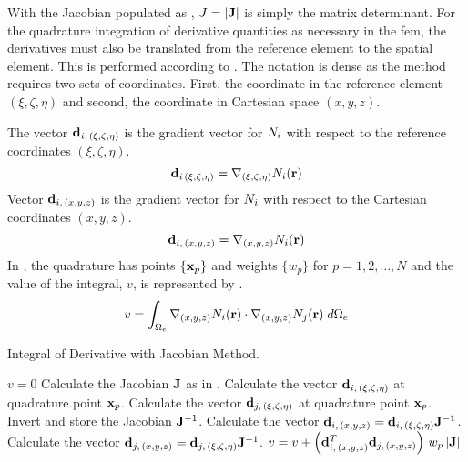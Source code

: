     With the Jacobian populated as , $J=\lvert\mathbf{J}\rvert$
    is simply the matrix determinant. For the quadrature integration of 
    derivative quantities as necessary in the \gls{fem}, the derivatives must 
    also be translated from the reference element to the spatial element. This 
    is performed according to . The notation 
    is dense as the method requires two sets of coordinates. First, the 
    coordinate in the reference element $(\xi,\zeta,\eta)$ and second, the 
    coordinate in Cartesian space $(x,y,z)$.

    The vector $\mathbf{d}_{i,\,(\xi,\zeta,\eta)}$ is the gradient vector for
    $N_i$ with respect to the reference coordinates $(\xi,\zeta,\eta)$.
    \begin{equation}
      \mathbf{d}_{i\,(\xi,\zeta,\eta)} = \mathbf{\nabla}_{(\xi,\zeta,\eta)} N_i(\mathbf{r}) 
    \end{equation}
    Vector $\mathbf{d}_{i,\,(x,y,z)}$ is the gradient vector for $N_i$ with
    respect to the Cartesian coordinates $(x,y,z)$. 
    \begin{equation}
      \mathbf{d}_{i,\,(x,y,z)} = \mathbf{\nabla}_{(x,y,z)} N_i(\mathbf{r})
    \end{equation}
    In , the quadrature has points $\{\mathbf{x}_p\}$ 
    and weights $\{w_p\}$ for $p = 1,2,\ldots,N$ and the value of the integral,
    $v$, is represented by .
    \begin{equation}
      \label{eq:deriv_integral}
      v = \int_{\Omega_e} \mathbf{\nabla}_{(x,y,z)} N_i(\mathbf{r}) \cdot 
        \mathbf{\nabla}_{(x,y,z)} N_j(\mathbf{r}) \; d\Omega_e
    \end{equation}

    \begin{algorithm}
      \caption{Integral of Derivative with Jacobian Method.}
      \label{algorithm:deriv_int}
      \begin{algorithmic}[1]
        \State $v=0$
          \State Calculate the Jacobian $\mathbf{J}$ as in .
          \State Calculate the vector $\mathbf{d}_{i,\,(\xi,\zeta,\eta)}$ at quadrature
            point $\mathbf{x}_p$.
          \State Calculate the vector $\mathbf{d}_{j,\,(\xi,\zeta,\eta)}$ at quadrature
            point $\mathbf{x}_p$.
          \State Invert and store the Jacobian $\mathbf{J}^{-1}$.
          \State Calculate the vector $\mathbf{d}_{i,\,(x,y,z)} =
            \mathbf{d}_{i,\,(\xi,\zeta,\eta)} \mathbf{J}^{-1}$.
          \State Calculate the vector $\mathbf{d}_{j,\,(x,y,z)} =
            \mathbf{d}_{j,\,(\xi,\zeta,\eta)} \mathbf{J}^{-1}$.
          \State $v = v + \left(\mathbf{d}_{i,\,(x,y,z)}^{T} \mathbf{d}_{j,\,(x,y,z)}\right)
            \, w_p \, \lvert \mathbf{J} \rvert$
        \EndFor
      \end{algorithmic}
    \end{algorithm}

